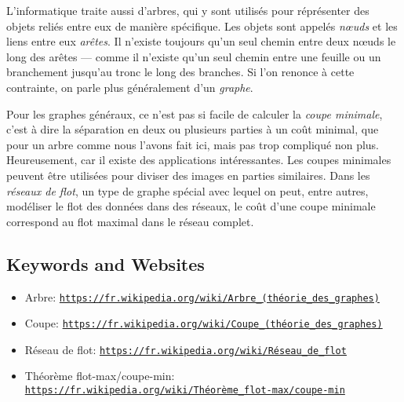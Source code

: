 \documentclass[a4paper,11pt]{report}
\newcommand{\BrochureUrlText}[1]{\texttt{#1}}
\begin{document}
L’informatique traite aussi d’arbres, qui y sont utilisés pour réprésenter des objets reliés entre eux de manière spécifique. Les objets sont appelés \emph{nœuds} et les liens entre eux \emph{arêtes}. Il n’existe toujours qu’un seul chemin entre deux nœuds le long des arêtes — comme il n’existe qu’un seul chemin entre une feuille ou un branchement jusqu’au tronc le long des branches. Si l’on renonce à cette contrainte, on parle plus généralement d’un \emph{graphe}.

Pour les graphes généraux, ce n’est pas si facile de calculer la \emph{coupe minimale}, c’est à dire la séparation en deux ou plusieurs parties à un coût minimal, que pour un arbre comme nous l’avons fait ici, mais pas trop compliqué non plus. Heureusement, car il existe des applications intéressantes. Les coupes minimales peuvent être utilisées pour diviser des images en parties similaires. Dans les \emph{réseaux de flot}, un type de graphe spécial avec lequel on peut, entre autres, modéliser le flot des données dans des réseaux, le coût d’une coupe minimale correspond au flot maximal dans le réseau complet.

{\raggedright

\subsection*{Keywords and Websites}

\begin{itemize}
  \item Arbre: \href{https://fr.wikipedia.org/wiki/Arbre_(th\%C3\%A9orie_des_graphes)}{\BrochureUrlText{https://fr.wikipedia.org/wiki/Arbre\_(théorie\_des\_graphes)}}
  \item Coupe: \href{https://fr.wikipedia.org/wiki/Coupe_(th\%C3\%A9orie_des_graphes)}{\BrochureUrlText{https://fr.wikipedia.org/wiki/Coupe\_(théorie\_des\_graphes)}}
  \item Réseau de flot: \href{https://fr.wikipedia.org/wiki/R\%C3\%A9seau_de_flot}{\BrochureUrlText{https://fr.wikipedia.org/wiki/Réseau\_de\_flot}}
  \item Théorème flot-max/coupe-min: \href{https://fr.wikipedia.org/wiki/Th\%C3\%A9or\%C3\%A8me_flot-max/coupe-min}{\BrochureUrlText{https://fr.wikipedia.org/wiki/Théorème\_flot-max/coupe-min}}
\end{itemize}


}
\end{document}
